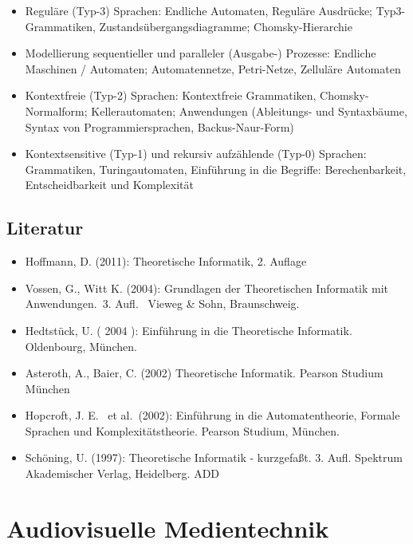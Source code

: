 \begin{itemize}
\tightlist
\item
  Reguläre (Typ-3) Sprachen: Endliche Automaten, Reguläre Ausdrücke;
  Typ3-Grammatiken, Zustandsübergangsdiagramme; Chomsky-Hierarchie
\item
  Modellierung sequentieller und paralleler (Ausgabe-) Prozesse:
  Endliche Maschinen / Automaten; Automatennetze, Petri-Netze, Zelluläre
  Automaten
\item
  Kontextfreie (Typ-2) Sprachen: Kontextfreie Grammatiken,
  Chomsky-Normalform; Kellerautomaten; Anwendungen (Ableitungs- und
  Syntaxbäume, Syntax von Programmiersprachen, Backus-Naur-Form)
\item
  Kontextsensitive (Typ-1) und rekursiv aufzählende (Typ-0) Sprachen:
  Grammatiken, Turingautomaten, Einführung in die Begriffe:
  Berechenbarkeit, Entscheidbarkeit und Komplexität
\end{itemize}

\hypertarget{literaturpathlabelmi-2017modulbeschreibungen-bachelorba_theoretischeinformatik2}{%
\section*{Literatur\label{/mi-2017/modulbeschreibungen-bachelor/BA_TheoretischeInformatik2}}\label{literaturpathlabelmi-2017modulbeschreibungen-bachelorba_theoretischeinformatik2}}

\begin{itemize}
\tightlist
\item
  Hoffmann, D. (2011): Theoretische Informatik, 2. Auflage
\item
  Vossen, G., Witt K. (2004): Grundlagen der Theoretischen Informatik
  mit Anwendungen.~3. Aufl.~ Vieweg \& Sohn, Braunschweig.
\item
  Hedtstück, U. ( 2004 ): Einführung in die Theoretische Informatik.
  Oldenbourg, München.
\item
  Asteroth, A., Baier, C. (2002) Theoretische Informatik. Pearson
  Studium München
\item
  Hopcroft, J. E.~ et al.~(2002): Einführung in die Automatentheorie,
  Formale Sprachen und Komplexitätstheorie. Pearson Studium, München.
\item
  Schöning, U. (1997): Theoretische Informatik - kurzgefaßt. 3. Aufl.
  Spektrum Akademischer Verlag, Heidelberg. ADD
\end{itemize}

\hypertarget{audiovisuelle-medientechnikpathlabelmi-2017modulbeschreibungen-bachelorba_vc-audiovisuelle-medientechnik}{%
\chapter{Audiovisuelle
Medientechnik\label{/mi-2017/modulbeschreibungen-bachelor/BA_VC-audiovisuelle-medientechnik}}\label{audiovisuelle-medientechnikpathlabelmi-2017modulbeschreibungen-bachelorba_vc-audiovisuelle-medientechnik}}

